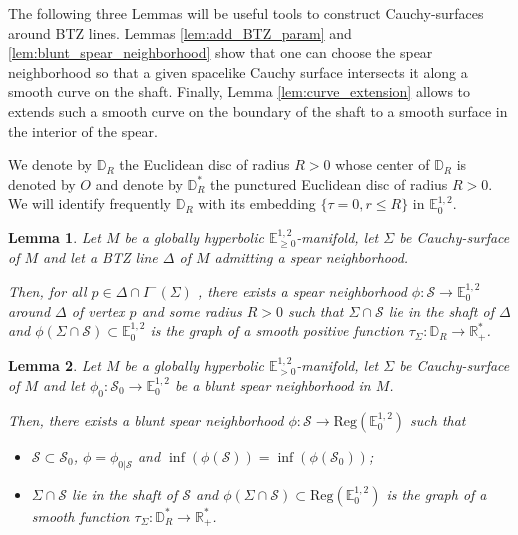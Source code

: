 \documentclass[a4paper,12pt]{article}
\def\S{\mathcal S}
\def\S{\mathcal{S}}
\def\RR{\mathbb{R}}
\newcommand{\mass}[1]{{\mathbb E}^{1,2}_{#1}}
\def\Reg{\mathrm{Reg}}
\newtheorem{lemou}{Lemma}[section]          %
\begin{document}
    
   The following three Lemmas will be useful tools to construct Cauchy-surfaces  around BTZ lines. Lemmas \ref{lem:add_BTZ_param} and \ref{lem:blunt_spear_neighborhood} show that one can choose the spear neighborhood so that a given spacelike Cauchy surface intersects it along a smooth curve on the shaft. Finally, Lemma \ref{lem:curve_extension} allows to extends such a smooth curve on the boundary of the shaft to a smooth surface in the interior of the spear. 
   
   


   
   
   We denote by $\mathbb D_R$ the Euclidean disc of radius $R>0$ whose center of $\mathbb D_R$ is denoted by $O$ and denote by  $\mathbb D_R^*$ the punctured  Euclidean disc of radius  $R>0$.
     We will identify frequently $\mathbb D_R$ with its embedding $\{\tau=0,r\leq R\}$ in $\mass{0}$.
  
   
	
	\begin{lemou}\label{btzlem:add_BTZ_param}\label{lem:add_BTZ_param}
        Let $M$ be a globally hyperbolic  $\mass{\geq0}$-manifold, let $\Sigma$ be Cauchy-surface of $M$ and let a BTZ line $\Delta$ of $M$ admitting a spear neighborhood.  
	
        Then,  for all  $p\in \Delta\cap I^-(\Sigma)$ , there exists a spear neighborhood $\phi:\mathcal S \rightarrow \mass{0}$ around $\Delta$ of vertex $p$ and some radius $R>0$ such that 
        $\Sigma\cap \S$ lie in the shaft of $\Delta$ and 
        $\phi(\Sigma\cap \mathcal S)\subset \mass{0}$ is the graph of a smooth positive function $\tau_\Sigma: \mathbb D_R\rightarrow \RR_+^*$. 
    \end{lemou}

\begin{lemou}\label{btzlem:blunt_spear_neighborhood}\label{lem:blunt_spear_neighborhood}
        Let $M$ be a globally hyperbolic  $\mass{>0}$-manifold, let $\Sigma$ be Cauchy-surface of $M$ and let $\phi_0: \mathcal S_0\rightarrow \mass{0}$ be a blunt spear neighborhood in $M$.  
	
	Then, there exists a blunt spear neighborhood $\phi:\mathcal S \rightarrow \Reg(\mass{0})$ such that 
	\begin{itemize}
	\item $\mathcal S\subset \mathcal S_0$, $\phi = \phi_{0|\mathcal S}$ and $\inf(\phi(\S))=\inf(\phi(\S_0))$;
	\item  $\Sigma\cap   \mathcal S$ lie in the shaft of $\mathcal S$ and $\phi(\Sigma\cap \mathcal S)\subset \Reg(\mass{0})$ is the graph of a smooth function $\tau_\Sigma: \mathbb D_R^*\rightarrow \RR_+^*$.  	
	\end{itemize}
     \end{lemou} 
 
\end{document}
